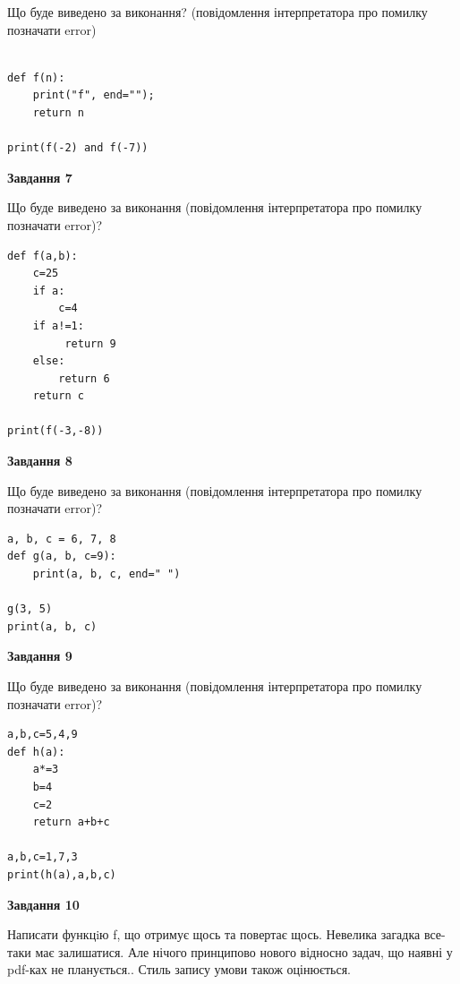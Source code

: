 \documentclass[12pt, ukrainian]{article}
\begin{document}
{\begin {large}
Що буде виведено за виконання? (повідомлення інтерпретатора про помилку позначати error)\par
\begin{verbatim}

def f(n):
    print("f", end="");
    return n

print(f(-2) and f(-7))
\end{verbatim}

{\begin {center}\textbf{Завдання 7}\end {center}}

Що буде виведено за виконання (повідомлення інтерпретатора про помилку позначати error)?\par
\begin{verbatim}
def f(a,b):
    c=25
    if a:
        c=4
    if a!=1:
         return 9
    else: 
        return 6
    return c

print(f(-3,-8))
\end{verbatim}

{\begin {center}\textbf{Завдання 8}\end {center}}

Що буде виведено за виконання (повідомлення інтерпретатора про помилку позначати error)?\par
\begin{verbatim}
a, b, c = 6, 7, 8
def g(a, b, c=9):
    print(a, b, c, end=" ")

g(3, 5)
print(a, b, c)
\end{verbatim}

{\begin {center}\textbf{Завдання 9}\end {center}}

Що буде виведено за виконання (повідомлення інтерпретатора про помилку позначати error)?\par
\begin{verbatim}
a,b,c=5,4,9
def h(a):
    a*=3
    b=4
    c=2
    return a+b+c

a,b,c=1,7,3
print(h(a),a,b,c)
\end{verbatim}

{\begin {center}\textbf{Завдання 10}\end {center}}


Написати функцiю f, що отримує щось та повертає щось. Невелика загадка все-таки має залишатися. Але нічого принципово нового відносно задач, що наявні у pdf-ках не планується.. Стиль запису умови також оцінюється.\par
\end {large}}
\newpage
\end{document}
